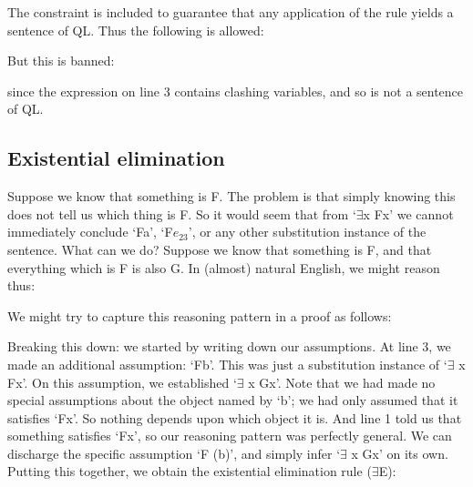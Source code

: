 The constraint is included to guarantee that any application of the rule yields a sentence of QL. Thus the following is allowed:
\begin{fitchproof}
\end{fitchproof}
But this is banned:
\begin{fitchproof}
\end{fitchproof}

since the expression on line 3 contains clashing variables, and so is not a sentence of QL.

\subsection{Existential elimination}

Suppose we know that something is F. The problem is that simply knowing this does not tell us which thing is F. So it would seem that from ‘$\exists$x Fx’ we cannot immediately conclude ‘Fa’, ‘F$e_{23}$’, or any other substitution instance of the sentence. What can we do? Suppose we know that something is F, and that everything which is F is also G. In (almost) natural English, we might reason thus:

We might try to capture this reasoning pattern in a proof as follows:
\begin{fitchproof}
\open
{}
\close
{}	
\end{fitchproof}
Breaking this down: we started by writing down our assumptions. At line 3, we made an additional assumption: ‘Fb’. This was just a substitution instance of ‘$\exists$ x Fx’. On this assumption, we established ‘$\exists$ x Gx’. Note that we had made no special assumptions about the object named by ‘b’; we had only assumed that it satisfies ‘Fx’. So nothing depends upon which object it is. And line 1 told us that something satisfies ‘Fx’, so our reasoning pattern was perfectly general. We can discharge the specific assumption ‘F (b)’, and simply infer ‘$\exists$ x Gx’ on its own. Putting this together, we obtain the existential elimination rule ($\exists$E):

